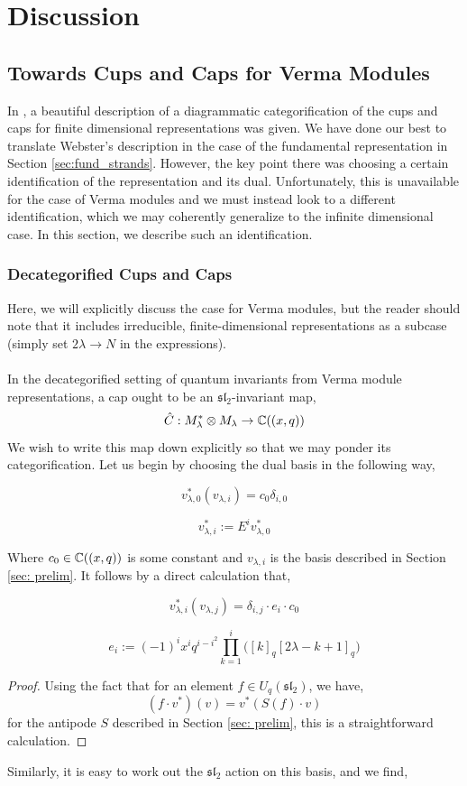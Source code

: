 \documentclass{article}
\begin{document}
\section{Discussion} \label{sec:discussion}
\subsection{Towards Cups and Caps for Verma Modules}
In \cite{Web}, a beautiful description of a diagrammatic categorification of the cups and caps for finite dimensional representations was given. We have done our best to translate Webster's description in the case of the fundamental representation in Section \ref{sec:fund_strands}. However, the key point there was choosing a certain identification of the representation and its dual. Unfortunately, this is unavailable for the case of Verma modules and we must instead look to a different identification, which we may coherently generalize to the infinite dimensional case. In this section, we describe such an identification. 
\subsubsection{Decategorified Cups and Caps}\label{sec:decat_cups_caps}
Here, we will explicitly discuss the case for Verma modules, but the reader should note that it includes irreducible, finite-dimensional representations as a subcase (simply set $2\lambda \rightarrow N$ in the expressions). \\ \\
In the decategorified setting of quantum invariants from Verma module representations, a cap ought to be an $\mathfrak{sl_2}$-invariant map, 
$$\hat{C}: M^*_\lambda\otimes M_\lambda \rightarrow {\mathbb C}((x,q))$$
We wish to write this map down explicitly so that we may ponder its categorification. Let us begin by choosing the dual basis in the following way, 

$$v_{\lambda,0}^*(v_{\lambda,i})=c_0 \delta_{i,0}$$

$$v_{\lambda,i}^* := E^iv_{\lambda,0}^*$$

Where $c_0 \in {\mathbb C}((x,q))$ is some constant and $v_{\lambda, i}$ is the basis described in Section \ref{sec: prelim}. It follows by a direct calculation that, 
\begin{prop}
$$v_{\lambda,i}^*(v_{\lambda,j}) = \delta_{i,j} \cdot e_i \cdot c_0$$

$$e_i := (-1)^i x^i q^{i-i^2}\prod^i_{k=1}\bigg( [k]_q [2\lambda-k+1]_q\bigg)$$
\end{prop}
\begin{proof}
    Using the fact that for an element $f\in U_q(\mathfrak{sl_2})$, we have, 
    $$(f \cdot v^*)(v) = v^* (S(f)\cdot v)$$
    for the antipode $S$ described in Section \ref{sec: prelim}, this is a straightforward calculation. 
\end{proof}
Similarly, it is easy to work out the $\mathfrak{sl_2}$ action on this basis, and we find, 
\end{document}
